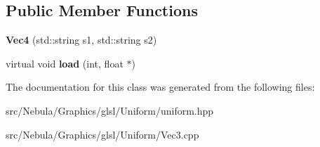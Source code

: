 \subsection*{\-Public \-Member \-Functions}
\begin{DoxyCompactItemize}
\item 
\hypertarget{classNeb_1_1glsl_1_1Uniform_1_1Vector_1_1Vec4_a507acc5ac257f999383cfa4a8622a34c}{{\bfseries \-Vec4} (std\-::string s1, std\-::string s2)}\label{classNeb_1_1glsl_1_1Uniform_1_1Vector_1_1Vec4_a507acc5ac257f999383cfa4a8622a34c}

\item 
\hypertarget{classNeb_1_1glsl_1_1Uniform_1_1Vector_1_1Vec4_a57629c898603f94ff642248f0e2ebc71}{virtual void {\bfseries load} (int, float $\ast$)}\label{classNeb_1_1glsl_1_1Uniform_1_1Vector_1_1Vec4_a57629c898603f94ff642248f0e2ebc71}

\end{DoxyCompactItemize}


\-The documentation for this class was generated from the following files\-:\begin{DoxyCompactItemize}
\item 
src/\-Nebula/\-Graphics/glsl/\-Uniform/uniform.\-hpp\item 
src/\-Nebula/\-Graphics/glsl/\-Uniform/\-Vec3.\-cpp\end{DoxyCompactItemize}
